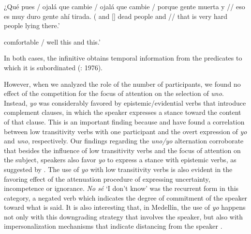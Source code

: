 \documentclass[output=paper]{langscibook}
\begin{document}
\eanoraggedright\label{ex:orozco:13}
{¿Qué}  {pues / ojalá que cambie / ojalá que cambie / porque}   {gente muerta y // eso es muy duro}  {gente ahí tirada.} ( 
    {and [}]  {dead people and // that is very hard}  {people lying there.’}
\ex\label{ex:orozco:14}
\begin{xlist}[`E.:]
  {comfortable /}  well this and this.’
\end{xlist}
\z 


In both cases, the infinitive obtains temporal information from the predicates to which it is subordinated (\citealt{NuevaGramática2009}: 1976).



However, when we analyzed the role of the number of participants, we found no effect of the competition for the focus of attention on the selection of \textit{uno}. Instead, \textit{yo} was considerably favored by epistemic/evidential verbs that introduce complement clauses, in which the speaker expresses a stance toward the content of that clause. This is an important finding because \citet{Posio2011} and \citet{HurtadoOrtega-Santos2019} have found a correlation between low transitivity verbs with one participant and the overt expression of \textit{yo} and \textit{uno}, respectively. Our findings regarding the \textit{uno/yo} alternation corroborate that besides the influence of low transitivity verbs and the focus of attention on the subject, speakers also favor \textit{yo} to express a stance with epistemic verbs, as suggested by \citet{Posio2011}. The use of \textit{yo} with low transitivity verbs is also evident in the favoring effect of the attenuation procedure of expressing uncertainty, incompetence or ignorance. \textit{No sé} ‘I don’t know’ was the recurrent form in this category, a negated verb which indicates the degree of commitment of the speaker toward what is said. It is also interesting that, in Medellín, the use of \textit{yo} happens not only with this downgrading strategy that involves the speaker, but also with impersonalization mechanisms that indicate distancing from the speaker \citep{CesteroMancera2020}. 
\end{document}
